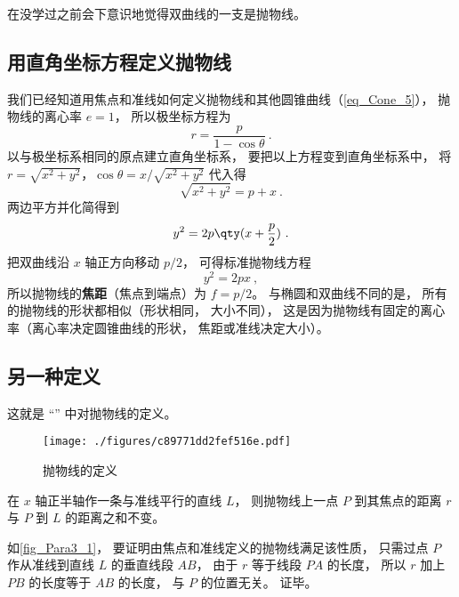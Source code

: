 

在没学过之前会下意识地觉得双曲线的一支是抛物线。

\subsection{用直角坐标方程定义抛物线}

我们已经知道用焦点和准线如何定义抛物线和其他圆锥曲线（\autoref{eq_Cone_5}）， 抛物线的离心率 $e = 1$， 所以极坐标方程为
\begin{equation}\label{eq_Para3_1}
r = \frac{p}{1 - \cos \theta }~.
\end{equation}
以与极坐标系相同的原点建立直角坐标系， 要把以上方程变到直角坐标系中， 将$r = \sqrt{x^2 + y^2}$，$\cos \theta  = x/\sqrt{x^2 + y^2}$ 代入得
\begin{equation}
\sqrt{x^2 + y^2}  = p + x~.
\end{equation}
两边平方并化简得到
\begin{equation}
y^2 = 2p \qty(x + \frac p2)~.
\end{equation}
把双曲线沿 $x$ 轴正方向移动 $p/2$， 可得标准抛物线方程
\begin{equation}\label{eq_Para3_2}
y^2 = 2px~,
\end{equation}
所以抛物线的\textbf{焦距}（焦点到端点）为 $f = p/2$。 与椭圆和双曲线不同的是， 所有的抛物线的形状都相似（形状相同， 大小不同）， 这是因为抛物线有固定的离心率（离心率决定圆锥曲线的形状， 焦距或准线决定大小）。

\subsection{另一种定义}
这就是 “” 中对抛物线的定义。
\begin{figure}[ht]
\centering
\texttt{[image: ./figures/c89771dd2fef516e.pdf]}
\caption{抛物线的定义} \label{fig_Para3_1}
\end{figure}

在 $x$ 轴正半轴作一条与准线平行的直线 $L$， 则抛物线上一点 $P$ 到其焦点的距离 $r$ 与 $P$ 到 $L$ 的距离之和不变。

如\autoref{fig_Para3_1}， 要证明由焦点和准线定义的抛物线满足该性质， 只需过点 $P$ 作从准线到直线 $L$ 的垂直线段 $AB$， 由于 $r$ 等于线段 $PA$ 的长度， 所以 $r$ 加上 $PB$ 的长度等于 $AB$ 的长度， 与 $P$ 的位置无关。 证毕。


